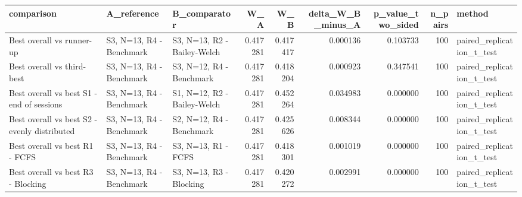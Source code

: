 \begin{tabular}{lllrrrrrl}
\toprule
comparison & A_reference & B_comparator & W_A & W_B & delta_W_B_minus_A & p_value_two_sided & n_pairs & method \\
\midrule
Best overall vs runner-up & S3, N=13, R4 - Benchmark & S3, N=13, R2 - Bailey-Welch & 0.417281 & 0.417417 & 0.000136 & 0.103733 & 100 & paired_replication_t_test \\
Best overall vs third-best & S3, N=13, R4 - Benchmark & S3, N=12, R4 - Benchmark & 0.417281 & 0.418204 & 0.000923 & 0.347541 & 100 & paired_replication_t_test \\
Best overall vs best S1 - end of sessions & S3, N=13, R4 - Benchmark & S1, N=12, R2 - Bailey-Welch & 0.417281 & 0.452264 & 0.034983 & 0.000000 & 100 & paired_replication_t_test \\
Best overall vs best S2 - evenly distributed & S3, N=13, R4 - Benchmark & S2, N=12, R4 - Benchmark & 0.417281 & 0.425626 & 0.008344 & 0.000000 & 100 & paired_replication_t_test \\
Best overall vs best R1 - FCFS & S3, N=13, R4 - Benchmark & S3, N=13, R1 - FCFS & 0.417281 & 0.418301 & 0.001019 & 0.000000 & 100 & paired_replication_t_test \\
Best overall vs best R3 - Blocking & S3, N=13, R4 - Benchmark & S3, N=13, R3 - Blocking & 0.417281 & 0.420272 & 0.002991 & 0.000000 & 100 & paired_replication_t_test \\
\bottomrule
\end{tabular}
